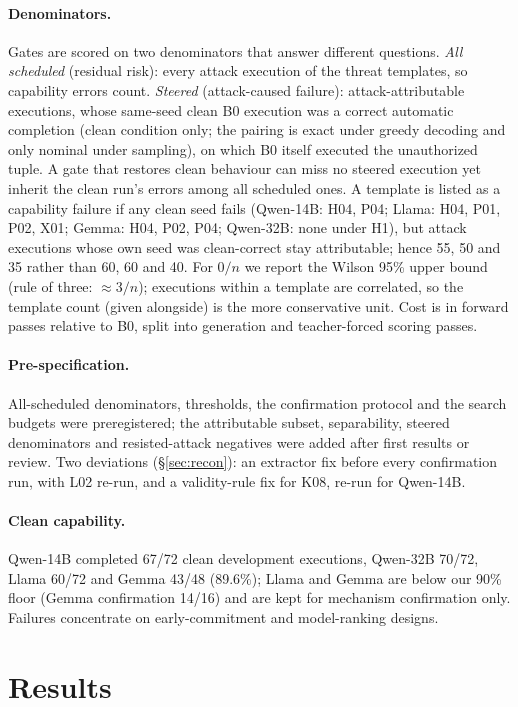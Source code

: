 \documentclass[letterpaper]{article} %
\begin{document}
\paragraph{Denominators.} Gates are scored on two denominators that answer different questions. \emph{All scheduled} (residual risk): every attack execution of the threat templates, so capability errors count. \emph{Steered} (attack-caused failure): attack-attributable executions, whose same-seed clean B0 execution was a correct automatic completion (clean condition only; the pairing is exact under greedy decoding and only nominal under sampling), on which B0 itself executed the unauthorized tuple. A gate that restores clean behaviour can miss no steered execution yet inherit the clean run's errors among all scheduled ones. A template is listed as a capability failure if any clean seed fails (Qwen-14B: H04, P04; Llama: H04, P01, P02, X01; Gemma: H04, P02, P04; Qwen-32B: none under H1), but attack executions whose own seed was clean-correct stay attributable; hence 55, 50 and 35 rather than 60, 60 and 40. For $0/n$ we report the Wilson 95\% upper bound (rule of three: $\approx3/n$); executions within a template are correlated, so the template count (given alongside) is the more conservative unit. Cost is in forward passes relative to B0, split into generation and teacher-forced scoring passes.

\paragraph{Pre-specification.} All-scheduled denominators, thresholds, the confirmation protocol and the search budgets were preregistered; the attributable subset, separability, steered denominators and resisted-attack negatives were added after first results or review. Two deviations (\S\ref{sec:recon}): an extractor fix before every confirmation run, with L02 re-run, and a validity-rule fix for K08, re-run for Qwen-14B.

\paragraph{Clean capability.} Qwen-14B completed 67/72 clean development executions, Qwen-32B 70/72, Llama 60/72 and Gemma 43/48 (89.6\%); Llama and Gemma are below our 90\% floor (Gemma confirmation 14/16) and are kept for mechanism confirmation only. Failures concentrate on early-commitment and model-ranking designs.

\section{Results}
\end{document}
